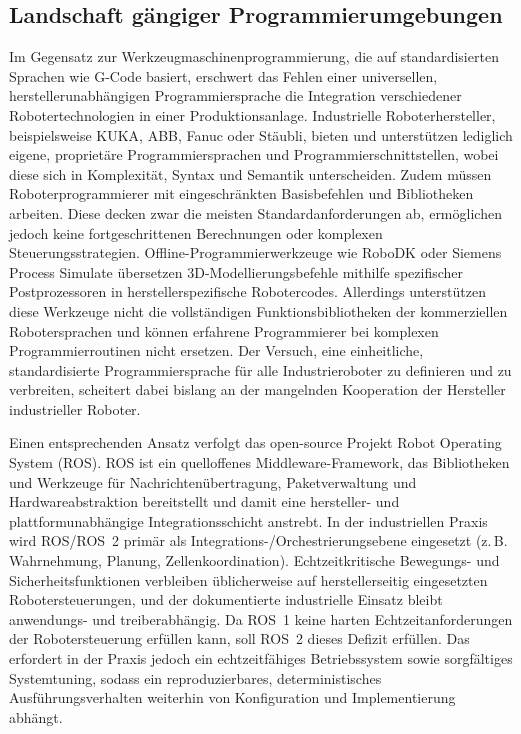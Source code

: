 \subsection{Landschaft gängiger Programmierumgebungen}
Im Gegensatz zur
Werkzeugmaschinenprogrammierung, die auf standardisierten Sprachen wie G-Code
basiert, erschwert das Fehlen einer universellen, herstellerunabhängigen
Programmiersprache die Integration verschiedener Robotertechnologien in einer
Produktionsanlage. Industrielle
Roboterhersteller, beispielsweise KUKA, ABB,
Fanuc oder Stäubli, bieten und unterstützen lediglich eigene,
proprietäre Programmiersprachen
und Programmierschnittstellen, wobei diese sich in
Komplexität, Syntax und Semantik
unterscheiden. Zudem müssen Roboterprogrammierer mit
eingeschränkten Basisbefehlen
und Bibliotheken arbeiten. Diese decken zwar die meisten Standardanforderungen
ab, ermöglichen jedoch keine fortgeschrittenen Berechnungen oder komplexen
Steuerungsstrategien. Offline-Programmierwerkzeuge wie RoboDK oder Siemens
Process Simulate übersetzen 3D-Modellierungsbefehle mithilfe spezifischer
Postprozessoren in herstellerspezifische Robotercodes. Allerdings unterstützen
diese Werkzeuge nicht die vollständigen Funktionsbibliotheken der kommerziellen
Robotersprachen und können erfahrene Programmierer bei komplexen
Programmierroutinen nicht ersetzen. Der
Versuch, eine einheitliche, standardisierte Programmiersprache für
alle Industrieroboter zu definieren und zu
verbreiten, scheitert dabei bislang an der mangelnden Kooperation der
Hersteller industrieller Roboter.

Einen entsprechenden Ansatz verfolgt das open-source Projekt
Robot Operating System (ROS). ROS ist ein quelloffenes
Middleware-Framework, das Bibliotheken und Werkzeuge für
Nachrichtenübertragung, Paketverwaltung und Hardwareabstraktion
bereitstellt und damit eine hersteller- und
plattformunabhängige Integrationsschicht
anstrebt. In der industriellen Praxis wird
ROS/ROS~2 primär als Integrations-/Orchestrierungsebene
eingesetzt (z.\,B. Wahrnehmung, Planung, Zellenkoordination).
Echtzeitkritische Bewegungs- und Sicherheitsfunktionen verbleiben
üblicherweise auf herstellerseitig eingesetzten Robotersteuerungen, und der
dokumentierte industrielle Einsatz bleibt anwendungs- und
treiberabhängig. Da ROS~1
keine harten Echtzeitanforderungen der Robotersteuerung erfüllen
kann, soll ROS~2 dieses Defizit erfüllen.
Das erfordert in der Praxis jedoch ein echtzeitfähiges
Betriebssystem sowie sorgfältiges Systemtuning,
sodass ein reproduzierbares, deterministisches Ausführungsverhalten
weiterhin von Konfiguration und
Implementierung
abhängt.

